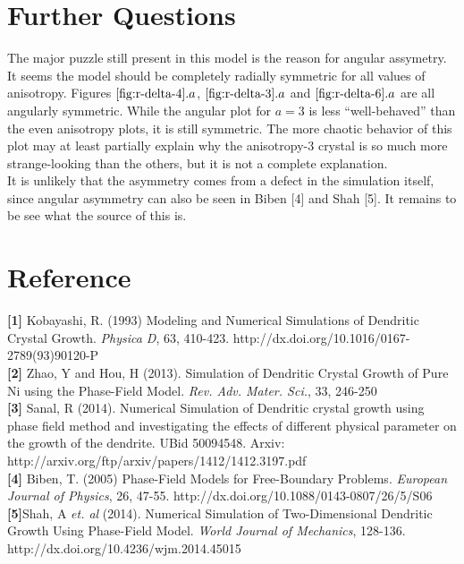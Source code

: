 \documentclass[10pt]{article} %
\begin{document}
\section{Further Questions}
The major puzzle still present in this model is the reason for angular assymetry. It seems the model should be completely radially symmetric for all values of anisotropy. Figures $\ref{fig:r-delta-4}.a$, $\ref{fig:r-delta-3}.a$ and $\ref{fig:r-delta-6}.a$ are all angularly symmetric. While the angular plot for $a=3$ is less ``well-behaved'' than the even anisotropy plots, it is still symmetric. The more chaotic behavior of this plot may at least partially explain why the anisotropy-3 crystal is so much more strange-looking than the others, but it is not a complete explanation.\\

It is unlikely that the asymmetry comes from a defect in the simulation itself, since angular asymmetry can also be seen in Biben [4] and Shah [5]. It remains to be see what the source of this is.\\

\section{Reference}
\textbf{[1]} Kobayashi, R. (1993) Modeling and Numerical Simulations of Dendritic Crystal Growth. \textit{Physica D}, 63, 410-423. http://dx.doi.org/10.1016/0167-2789(93)90120-P\\
\textbf{[2]} Zhao, Y and Hou, H (2013). Simulation of Dendritic Crystal Growth of Pure Ni using the Phase-Field Model. \textit{Rev. Adv. Mater. Sci.}, 33, 246-250\\
\textbf{[3]} Sanal, R (2014). Numerical Simulation of Dendritic crystal growth using phase field method and investigating the effects of different physical parameter on the growth of the dendrite. UBid 50094548. Arxiv: http://arxiv.org/ftp/arxiv/papers/1412/1412.3197.pdf\\
\textbf{[4]} Biben, T. (2005) Phase-Field Models for Free-Boundary Problems. \textit{European Journal of Physics}, 26, 47-55. http://dx.doi.org/10.1088/0143-0807/26/5/S06
\textbf{[5]}Shah, A \textit{et. al} (2014). Numerical Simulation of Two-Dimensional Dendritic Growth Using Phase-Field Model. \textit{World Journal of Mechanics}, 128-136. http://dx.doi.org/10.4236/wjm.2014.45015
\end{document}
